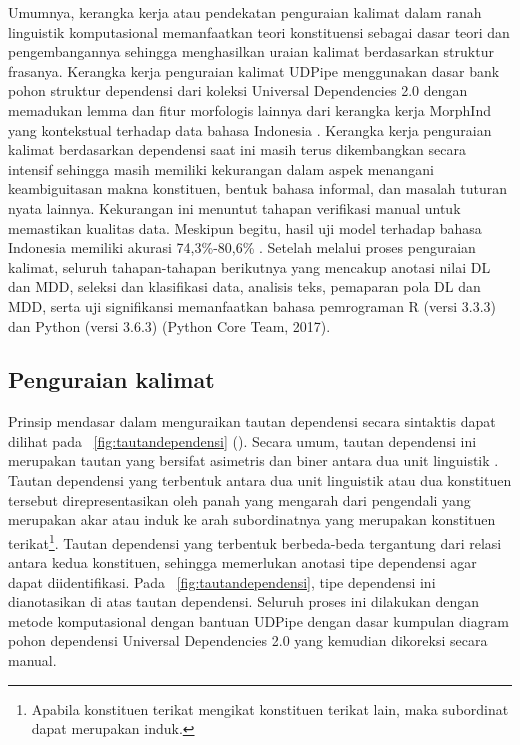Umumnya, kerangka kerja atau pendekatan penguraian kalimat dalam ranah linguistik komputasional memanfaatkan teori konstituensi sebagai dasar teori dan pengembangannya sehingga menghasilkan uraian kalimat berdasarkan struktur frasanya. Kerangka kerja penguraian kalimat UDPipe menggunakan dasar bank pohon struktur dependensi dari koleksi Universal Dependencies 2.0 \citep{nivre2017universal} dengan memadukan lemma dan fitur morfologis lainnya dari kerangka kerja MorphInd yang kontekstual terhadap data bahasa Indonesia \citep{larasati2011indonesian}. Kerangka kerja penguraian kalimat berdasarkan dependensi saat ini masih terus dikembangkan secara intensif sehingga masih memiliki kekurangan dalam aspek menangani keambiguitasan makna konstituen, bentuk bahasa informal, dan masalah tuturan nyata lainnya. Kekurangan ini menuntut tahapan verifikasi manual untuk memastikan kualitas data. Meskipun begitu, hasil uji model terhadap bahasa Indonesia memiliki akurasi 74,3\%-80,6\% \citep{udpipe2017}. Setelah melalui proses penguraian kalimat, seluruh tahapan-tahapan berikutnya yang mencakup anotasi nilai DL dan MDD, seleksi dan klasifikasi data, analisis teks, pemaparan pola DL dan MDD, serta uji signifikansi memanfaatkan bahasa pemrograman R (versi 3.3.3) \citep{r2017project} dan Python (versi 3.6.3) (Python Core Team, 2017).

\subsection{Penguraian kalimat}
Prinsip mendasar dalam menguraikan tautan dependensi secara sintaktis dapat dilihat pada \pic~\ref{fig:tautandependensi} (\citealp{tesniere1959elements, hudson1984word, liu2008dependency, liu2017dependency}). Secara umum, tautan dependensi ini merupakan tautan yang bersifat asimetris dan biner antara dua unit linguistik \citep{tesniere1959elements}. Tautan dependensi yang terbentuk antara dua unit linguistik atau dua konstituen tersebut direpresentasikan oleh panah yang mengarah dari pengendali yang merupakan akar atau induk ke arah subordinatnya yang merupakan konstituen terikat\footnote{Apabila konstituen terikat mengikat konstituen terikat lain, maka subordinat dapat merupakan induk.}. Tautan dependensi yang terbentuk berbeda-beda tergantung dari relasi antara kedua konstituen, sehingga memerlukan anotasi tipe dependensi agar dapat diidentifikasi. Pada \pic~\ref{fig:tautandependensi}, tipe dependensi ini dianotasikan di atas tautan dependensi. Seluruh proses ini dilakukan dengan metode komputasional dengan bantuan UDPipe \citep{udpipe2017} dengan dasar kumpulan diagram pohon dependensi Universal Dependencies 2.0 \citep{nivre2017universal} yang kemudian dikoreksi secara manual.

